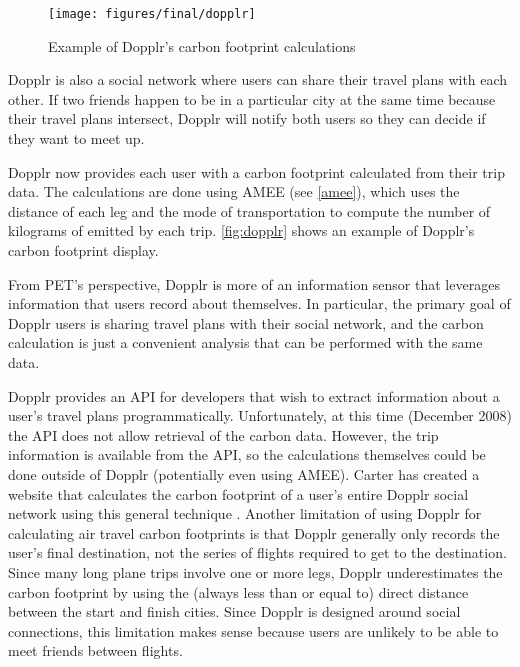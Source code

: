 \begin{figure}[htb]
	\begin{center}
		\texttt{[image: figures/final/dopplr]}
		\caption{Example of Dopplr's carbon footprint calculations}
		\label{fig:dopplr}
 	\end{center}
\end{figure}

Dopplr is also a social network where users can share their travel plans with each other. If two friends happen to be in a particular city at the same time because their travel plans intersect, Dopplr will notify both users so they can decide if they want to meet up.

Dopplr now provides each user with a carbon footprint calculated from their trip data. The calculations are done using AMEE (see \autoref{amee}), which uses the distance of each leg and the mode of transportation to compute the number of kilograms of \COtwo emitted by each trip. \autoref{fig:dopplr} shows an example of Dopplr's carbon footprint display.

From PET's perspective, Dopplr is more of an information sensor that leverages information that users record about themselves. In particular, the primary goal of Dopplr users is sharing travel plans with their social network, and the carbon calculation is just a convenient analysis that can be performed with the same data.

Dopplr provides an API for developers that wish to extract information about a user's travel plans programmatically. Unfortunately, at this time (December 2008) the API does not allow retrieval of the carbon data. However, the trip information is available from the API, so the calculations themselves could be done outside of Dopplr (potentially even using AMEE). Carter has created a website that calculates the carbon footprint of a user's entire Dopplr social network using this general technique \cite{offsetr-website}. Another limitation of using Dopplr for calculating air travel carbon footprints is that Dopplr generally only records the user's final destination, not the series of flights required to get to the destination. Since many long plane trips involve one or more legs, Dopplr underestimates the carbon footprint by using the (always less than or equal to) direct distance between the start and finish cities. Since Dopplr is designed around social connections, this limitation makes sense because users are unlikely to be able to meet friends between flights.

